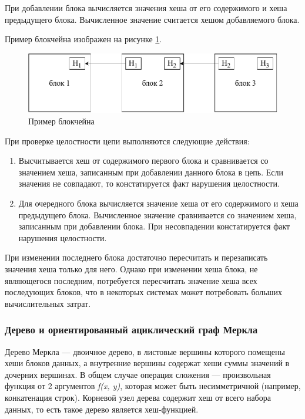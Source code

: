 При добавлении блока вычисляется значения хеша от его содержимого и хеша предыдущего блока. Вычисленное значение считается хешом добавляемого блока.

Пример блокчейна изображен на рисунке \ref{fig:blockchain}.

\begin{figure}[hbtp]
	\centering
	\includegraphics[width=\textwidth]{img/blockchain.pdf}
	\caption{Пример блокчейна}
	\label{fig:blockchain}
\end{figure}

При проверке целостности цепи выполняются следующие действия:
\begin{enumerate}
	\item Высчитывается хеш от содержимого первого блока и сравнивается со значением хеша, записанным при добавлении данного блока в цепь. Если значения не совпадают, то констатируется факт нарушения целостности.
	\item Для очередного блока вычисляется значение хеша от его содержимого и хеша предыдущего блока. Вычисленное значение сравнивается со значением хеша, записанным при добавлении блока. При несовпадении констатируется факт нарушения целостности.
\end{enumerate}

При изменении последнего блока достаточно пересчитать и перезаписать значения хеша только для него. Однако при изменении хеша блока, не являющегося последним, потребуется пересчитать значение хеша всех последующих блоков, что в некоторых системах может потребовать больших вычислительных затрат.

\subsubsection{Дерево и ориентированный ациклический граф Меркла}

Дерево Меркла \cite{merkle} --- двоичное дерево, в листовые вершины которого помещены хеши блоков данных, а внутренние вершины содержат хеши суммы значений в дочерних вершинах. В общем случае операция сложения --- произвольная функция от 2 аргументов \textit{f(x, y)}, которая может быть несимметричной (например, конкатенация строк). Корневой узел дерева содержит хеш от всего набора данных, то есть такое дерево является хеш-функцией.

